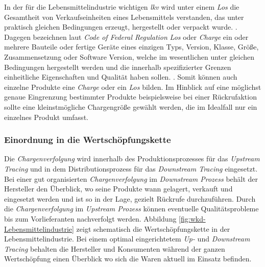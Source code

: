In der für die Lebensmittelindustrie wichtigen \textit{\ac{lkv}} wird unter einem \textit{Los} \glqq die Gesamtheit von Verkaufseinheiten eines Lebensmittels verstanden, das unter praktisch gleichen Bedingungen erzeugt, hergestellt oder verpackt wurde.\grqq{} \citep{LKV1993}. Dagegen bezeichnen laut \textit{Code of Federal Regulation} \textit{Los} oder \textit{Charge} \glqq ein oder mehrere Bauteile oder fertige Geräte eines einzigen Typs, Version, Klasse, Größe, Zusammensetzung oder Software Version, welche im wesentlichen unter gleichen Bedingungen hergestellt werden und die innerhalb spezifizierter Grenzen einheitliche Eigenschaften und Qualität haben sollen.\grqq{} \citep{QSR1996}. Somit können auch einzelne Produkte eine \textit{Charge} oder ein \textit{Los} bilden. Im Hinblick auf eine möglichst genaue Eingrenzung bestimmter Produkte beispielsweise bei einer Rückrufaktion sollte eine kleinstmögliche Chargengröße gewählt werden, die im Idealfall nur ein einzelnes Produkt umfasst.

\subsubsection{Einordnung in die Wertschöpfungskette}

Die \textit{Chargenverfolgung} wird innerhalb des Produktionsprozesses für das \textit{Upstream Tracing} und in dem Distributionsprozess für das \textit{Downstream Tracing} eingesetzt. Bei einer gut organisierten \textit{Chargenverfolgung} im \textit{Downstream Prozess} behält der Hersteller den Überblick, wo seine Produkte wann gelagert, verkauft und eingesetzt werden und ist so in der Lage, gezielt Rückrufe durchzuführen. Durch die \textit{Chargenverfolgung} im \textit{Upstream Prozess} können eventuelle Qualitätsprobleme bis zum Vorlieferanten nachverfolgt werden. Abbildung \ref{fig:wkd-Lebensmittelindustrie} zeigt schematisch die Wertschöpfungskette in der Lebensmittelindustrie. Bei einem optimal eingerichtetem \textit{Up-} und \textit{Downstream Tracing} behalten die Hersteller und Konsumenten während der ganzen Wertschöpfung einen Überblick wo sich die Waren aktuell im Einsatz befinden.


